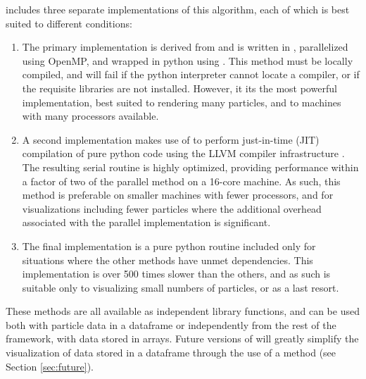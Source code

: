 includes three separate implementations of this algorithm, each of which is best suited to different conditions:
\begin{enumerate}
\item The primary implementation is derived from \citet{NavratilJohnsonBromm2007} and is written in , parallelized using OpenMP, and wrapped in python using .  This method must be locally compiled, and will fail if the python interpreter cannot locate a  compiler, or if the requisite libraries are not installed.  However, it its the most powerful implementation, best suited to rendering many particles, and to machines with many processors available.
\item A second implementation makes use of  \citep{LamPitrouSeibert2015} to perform just-in-time (JIT) compilation of pure python code using the LLVM compiler infrastructure \citep{LattnerAdve2004}.  The resulting serial routine is highly optimized, providing performance within a factor of two of the parallel method on a 16-core machine.  As such, this method is preferable on smaller machines with fewer processors, and for visualizations including fewer particles where the additional overhead associated with the parallel implementation is significant.
\item The final implementation is a pure python routine included only for situations where the other methods have unmet dependencies. This implementation is over 500 times slower than the others, and as such is suitable only to visualizing small numbers of particles, or as a last resort.
\end{enumerate}

These methods are all available as independent library functions, and can be used both with particle data in a  dataframe or independently from the rest of the  framework, with data stored in  arrays.  
Future versions of  will greatly simplify the visualization of data stored in a  dataframe through the use of a  method (see Section \ref{sec:future}).